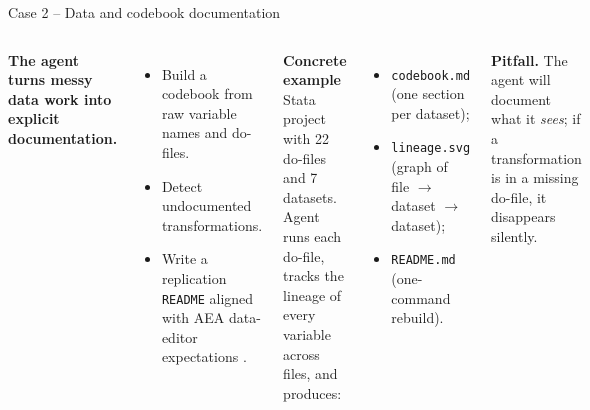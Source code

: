 \begin{frame}{Case 2 -- Data and codebook documentation}
  \begin{columns}[T,onlytextwidth]
      \textbf{The agent turns messy data work into explicit documentation.}
      \begin{itemize}\setlength\itemsep{0.3em}
        \item Build a codebook from raw variable names and do-files.
        \item Detect undocumented transformations.
        \item Write a replication \texttt{README} aligned with AEA data-editor expectations \citep{vilhuber_hdsr_2020}.
      \end{itemize}
      \textbf{Concrete example}\\[0.15cm]
      \scriptsize
      Stata project with 22 do-files and 7 datasets. Agent runs each do-file, tracks the lineage of every variable across files, and produces:
      \begin{itemize}\setlength\itemsep{0.2em}
        \item \texttt{codebook.md} (one section per dataset);
        \item \texttt{lineage.svg} (graph of file $\rightarrow$ dataset $\rightarrow$ dataset);
        \item \texttt{README.md} (one-command rebuild).
      \end{itemize}
      \vspace{0.1cm}
      \textbf{Pitfall.} The agent will document what it \emph{sees}; if a transformation is in a missing do-file, it disappears silently.
  \end{columns}
\end{frame}

